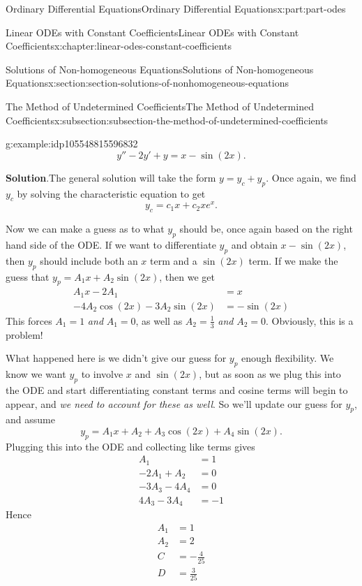 \documentclass[twoside,10pt,]{book}
\newcommand{\blocktitlefont}{\relax}
\numberwithin{equation}{part}
\newcommand{\amp}{&}
\begin{document}
\begin{partptx}{Ordinary Differential Equations}{}{Ordinary Differential Equations}{}{}{x:part:part-odes}
\begin{chapterptx}{Linear ODEs with Constant Coefficients}{}{Linear ODEs with Constant Coefficients}{}{}{x:chapter:linear-odes-constant-coefficients}
\begin{sectionptx}{Solutions of Non-homogeneous Equations}{}{Solutions of Non-homogeneous Equations}{}{}{x:section:section-solutions-of-nonhomogeneous-equations}
\begin{subsectionptx}{The Method of Undetermined Coefficients}{}{The Method of Undetermined Coefficients}{}{}{x:subsection:subsection-the-method-of-undetermined-coefficients}
\begin{example}{}{g:example:idp105548815596832}
\begin{equation*}
y'' - 2y' + y = x - \sin(2x).
\end{equation*}
%
\par\smallskip%
\noindent\textbf{\blocktitlefont Solution}.\hypertarget{g:solution:idp105548815597728}{}\quad{}The general solution will take the form \(y = y_{c} + y_{p}\). Once again, we find \(y_{c}\) by solving the characteristic equation to get%
\begin{equation*}
y_{c} = c_{1}x + c_{2}xe^{x}.
\end{equation*}
%
\par
Now we can make a guess as to what \(y_{p}\) should be, once again based on the right hand side of the ODE. If we want to differentiate \(y_{p}\) and obtain \(x - \sin(2x)\), then \(y_{p}\) should include both an \(x\) term and a \(\sin(2x)\) term. If we make the guess that \(y_{p} = A_{1}x + A_{2}\sin(2x)\), then we get%
\begin{align*}
A_{1}x - 2A_{1} \amp = x \\
-4A_{2}\cos(2x) - 3A_{2}\sin(2x) \amp = -\sin(2x) 
\end{align*}
This forces \(A_{1} = 1\) \emph{and} \(A_{1} = 0\), as well as \(A_{2} = \frac{1}{3}\) \emph{and} \(A_{2} = 0\). Obviously, this is a problem!%
\par
What happened here is we didn't give our guess for \(y_{p}\) enough flexibility. We know we want \(y_{p}\) to involve \(x\) and \(\sin(2x)\), but as soon as we plug this into the ODE and start differentiating constant terms and cosine terms will begin to appear, and \emph{we need to account for these as well}. So we'll update our guess for \(y_{p}\), and assume%
\begin{equation*}
y_{p} = A_{1}x + A_{2} + A_{3}\cos(2x) + A_{4}\sin(2x).
\end{equation*}
Plugging this into the ODE and collecting like terms gives%
\begin{align*}
A_{1} \amp = 1\\
-2A_{1} + A_{2} \amp = 0\\
-3A_{3} - 4A_{4} \amp = 0\\
4A_{3} - 3A_{4} \amp = -1
\end{align*}
Hence%
\begin{align*}
A_{1} \amp = 1 \\
A_{2} \amp = 2 \\
C \amp = -\frac{4}{25} \\
D \amp = \frac{3}{25} 
\end{align*}

\end{example}
\end{subsectionptx}
\end{sectionptx}
\end{chapterptx}
\end{partptx}
\end{document}
